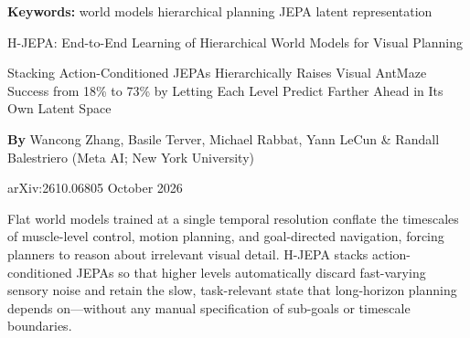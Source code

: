 \documentclass[10pt,twocolumn]{article}
\begin{document}
\setlength{\parindent}{0pt}
\setlength{\parskip}{4pt}

{\small\color{keywordgray}\textbf{Keywords:}
  world models \textbullet{}
  hierarchical planning \textbullet{}
  JEPA \textbullet{}
  latent representation}\par\vspace{4pt}

{\LARGE\bfseries\raggedright
  H-JEPA: End-to-End Learning of Hierarchical World Models for
  Visual Planning}\par\vspace{4pt}

{\large\itshape\raggedright
  Stacking Action-Conditioned JEPAs Hierarchically Raises Visual AntMaze
  Success from 18\% to 73\% by Letting Each Level Predict Farther Ahead in
  Its Own Latent Space}\par\vspace{6pt}

{\small\textbf{By} Wancong Zhang, Basile Terver, Michael Rabbat, Yann LeCun
  \& Randall Balestriero (Meta AI; New York University)}\par\vspace{2pt}

{\small\color{keywordgray}arXiv:2610.06805 \textbullet{} October 2026}
\par\vspace{2pt}\noindent{\color{rulered}\rule{\columnwidth}{0.6pt}}\vspace{6pt}

Flat world models trained at a single temporal resolution conflate the
timescales of muscle-level control, motion planning, and goal-directed
navigation, forcing planners to reason about irrelevant visual detail.
H-JEPA stacks action-conditioned JEPAs so that higher levels automatically
discard fast-varying sensory noise and retain the slow, task-relevant state
that long-horizon planning depends on---without any manual specification
of sub-goals or timescale boundaries.
\end{document}
